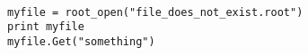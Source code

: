 \begin{footnotesize}
\begin{verbatim}

myfile = root_open("file_does_not_exist.root")
print myfile
myfile.Get("something")
\end{verbatim}
\end{footnotesize}
